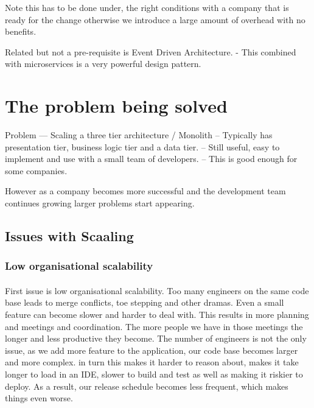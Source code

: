 \documentclass[a4paper, 11pt]{book}
\begin{document}
    Note this has to be done under, the right conditions with a company that is ready for the change otherwise we introduce a large amount of overhead with no benefits.

    Related but not a pre-requisite is Event Driven Architecture.
    - This combined with microservices is a very powerful design pattern.


    \section{The problem being solved}
    Problem --- Scaling a three tier architecture / Monolith
    -- Typically has presentation tier, business logic tier and a data tier.
    -- Still useful, easy to implement and use with a small team of developers.
    -- This is good enough for some companies.

    However as a company becomes more successful and the development team continues growing larger problems start appearing.

    \subsection{Issues with Scaaling}

    \subsubsection{Low organisational scalability}

    \paragraph{}
    First issue is low organisational scalability.
    Too many engineers on the same code base leads to merge conflicts, toe stepping and other dramas.
    Even a small feature can become slower and harder to deal with.
    This results in more planning and meetings and coordination.
    The more people we have in those meetings the longer and less productive they become.
    The number of engineers is not the only issue, as we add more feature to the application, our code base becomes larger and more complex.
    in turn this makes it harder to reason about, makes it take longer to load in an IDE, slower to build and test as well as making it riskier to deploy.
    As a result, our release schedule becomes less frequent, which makes things even worse.
\end{document}

